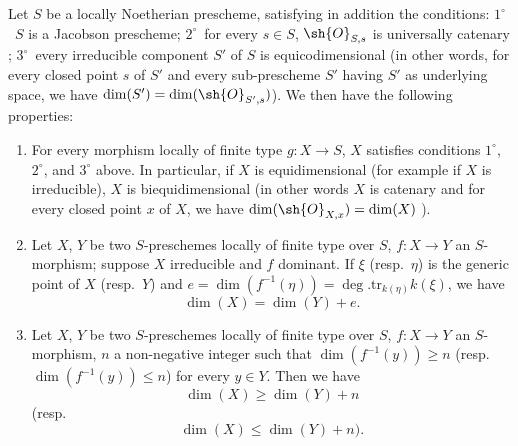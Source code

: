 \begin{proposition}[10.6.1]
\label{IV.10.6.1}
Let $S$ be a locally Noetherian prescheme, satisfying in addition the conditions: $1^\circ$~$S$ is a Jacobson prescheme; $2^\circ$~for every $s\in S$, $\sh{O}_{S,s}$ is universally catenary ; $3^\circ$~every irreducible component $S'$ of $S$ is equicodimensional (in other words, for every closed point $s$ of $S'$ and every sub-prescheme $S'$ having $S'$ as underlying space, we have $\dim(S')=\dim(\sh{O}_{S',s})$).
We then have the following properties:
\begin{enumerate}[label=(\roman*)]
  \item For every morphism locally of finite type $g:X\to S$, $X$ satisfies conditions $1^\circ$, $2^\circ$, and $3^\circ$ above.
In particular, if $X$ is equidimensional (for example if $X$ is irreducible), $X$ is biequidimensional (in other words $X$ is catenary and for every closed point $x$ of $X$, we have $\dim(\sh{O}_{X,x})=\dim(X)$ ).
  \item Let $X$, $Y$ be two $S$-preschemes locally of finite type over $S$, $f:X\to Y$ an $S$-morphism; suppose $X$ irreducible and $f$ dominant.
If $\xi$ (resp.\ $\eta$) is the generic point of $X$ (resp.\ $Y$) and $e=\dim(f^{-1}(\eta))=\deg.\mathrm{tr}_{k(\eta)}k(\xi)$, we have
\begin{equation}
\label{IV.10.6.1.1}
\tag{10.6.1.1}
\dim(X)=\dim(Y)+e.
\end{equation}
  \item Let $X$, $Y$ be two $S$-preschemes locally of finite type over $S$, $f:X\to Y$ an $S$-morphism, $n$ a non-negative integer such that $\dim(f^{-1}(y))\geq n$ (resp.\ $\dim(f^{-1}(y))\leq n$) for every $y\in Y$.
Then we have
\begin{equation}
\label{IV.10.6.1.2}
\tag{10.6.1.2}
\dim(X)\geq\dim(Y)+n
\end{equation}
(resp.
\begin{equation}
\label{IV.10.6.1.3}
\tag{10.6.1.3}
\dim(X)\leq\dim(Y)+n).
\end{equation}
\end{enumerate}
\end{proposition}

